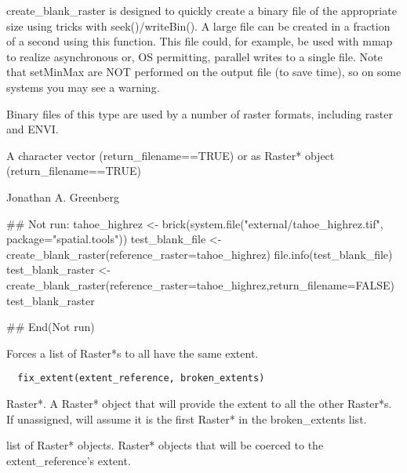\documentclass[a4paper]{book}
\begin{document}
%
\begin{Details}\relax
create\_blank\_raster is designed to quickly create a
binary file of the appropriate size using tricks with
seek()/writeBin(). A large file can be created in a
fraction of a second using this function. This file
could, for example, be used with mmap to realize
asynchronous or, OS permitting, parallel writes to a
single file.  Note that setMinMax are NOT performed on
the output file (to save time), so on some systems you
may see a warning.

Binary files of this type are used by a number of raster
formats, including raster and ENVI.
\end{Details}
%
\begin{Value}
A character vector (return\_filename==TRUE) or as Raster*
object (return\_filename==TRUE)
\end{Value}
%
\begin{Author}\relax
Jonathan A. Greenberg
\end{Author}
%
\begin{Examples}
\begin{ExampleCode}
## Not run: 
tahoe_highrez <- brick(system.file("external/tahoe_highrez.tif", package="spatial.tools"))
test_blank_file <- create_blank_raster(reference_raster=tahoe_highrez)
file.info(test_blank_file)
test_blank_raster <- create_blank_raster(reference_raster=tahoe_highrez,return_filename=FALSE)
test_blank_raster

## End(Not run)
\end{ExampleCode}
\end{Examples}
%
\begin{Description}\relax
Forces a list of Raster*s to all have the same extent.
\end{Description}
%
\begin{Usage}
\begin{verbatim}
  fix_extent(extent_reference, broken_extents)
\end{verbatim}
\end{Usage}
%
\begin{Arguments}
\begin{ldescription}
\item[\code{extent\_reference}] Raster*. A Raster* object that
will provide the extent to all the other Raster*s.  If
unassigned, will assume it is the first Raster* in the
broken\_extents list.

\item[\code{broken\_extents}] list of Raster* objects. Raster*
objects that will be coerced to the extent\_reference's
extent.
\end{ldescription}
\end{Arguments}
\end{document}

